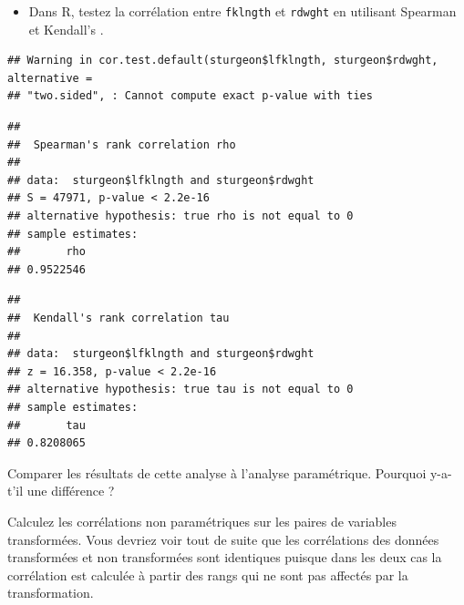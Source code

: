 \documentclass[12pt,]{book}
\newenvironment{Shaded}{\begin{snugshade}}{\end{snugshade}}
\newcommand{\DataTypeTok}[1]{\textcolor[rgb]{0.27,0.27,0.27}{#1}}
\newcommand{\KeywordTok}[1]{\textcolor[rgb]{0.27,0.27,0.27}{\textbf{#1}}}
\newcommand{\NormalTok}[1]{#1}
\newcommand{\OperatorTok}[1]{\textcolor[rgb]{0.43,0.43,0.43}{\textbf{#1}}}
\newcommand{\StringTok}[1]{\textcolor[rgb]{0.5,0.5,0.5}{#1}}
\providecommand{\tightlist}{%
  \setlength{\itemsep}{0pt}\setlength{\parskip}{0pt}}
\begin{document}
\begin{itemize}
\tightlist
\item
  Dans R, testez la corrélation entre \texttt{fklngth} et \texttt{rdwght} en utilisant Spearman et Kendall's .
\end{itemize}

\begin{Shaded}
\end{Shaded}

\begin{verbatim}
## Warning in cor.test.default(sturgeon$lfklngth, sturgeon$rdwght, alternative =
## "two.sided", : Cannot compute exact p-value with ties
\end{verbatim}

\begin{verbatim}
## 
## 	Spearman's rank correlation rho
## 
## data:  sturgeon$lfklngth and sturgeon$rdwght
## S = 47971, p-value < 2.2e-16
## alternative hypothesis: true rho is not equal to 0
## sample estimates:
##       rho 
## 0.9522546
\end{verbatim}

\begin{Shaded}
\end{Shaded}

\begin{verbatim}
## 
## 	Kendall's rank correlation tau
## 
## data:  sturgeon$lfklngth and sturgeon$rdwght
## z = 16.358, p-value < 2.2e-16
## alternative hypothesis: true tau is not equal to 0
## sample estimates:
##       tau 
## 0.8208065
\end{verbatim}

Comparer les résultats de cette analyse à l'analyse paramétrique.
Pourquoi y-a-t'il une différence ?

Calculez les corrélations non paramétriques sur les paires de variables transformées.
Vous devriez voir tout de suite que les corrélations des données transformées et non transformées sont identiques puisque dans les deux cas la corrélation est calculée à partir des rangs qui ne sont pas affectés par la transformation.
\end{document}
